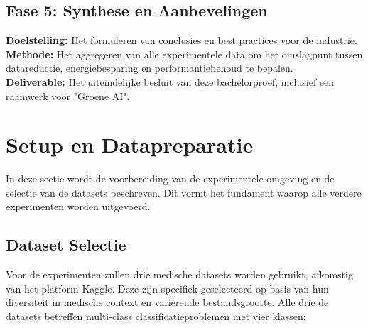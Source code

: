 \subsection{Fase 5: Synthese en Aanbevelingen}
\textbf{Doelstelling:} Het formuleren van conclusies en best practices voor de industrie. \\
\textbf{Methode:} Het aggregeren van alle experimentele data om het omslagpunt tussen datareductie, energiebesparing en performantiebehoud te bepalen. \\
\textbf{Deliverable:} Het uiteindelijke besluit van deze bachelorproef, inclusief een raamwerk voor "Groene AI".



\section{Setup en Datapreparatie}
\label{sec:setup}
In deze sectie wordt de voorbereiding van de experimentele omgeving en de selectie van de datasets beschreven. Dit vormt het fundament waarop alle verdere experimenten worden uitgevoerd.

\subsection{Dataset Selectie}
Voor de experimenten zullen drie medische datasets worden gebruikt, afkomstig van het platform Kaggle. Deze zijn specifiek geselecteerd op basis van hun diversiteit in medische context en variërende bestandsgrootte. Alle drie de datasets betreffen multi-class classificatieproblemen met vier klassen:


